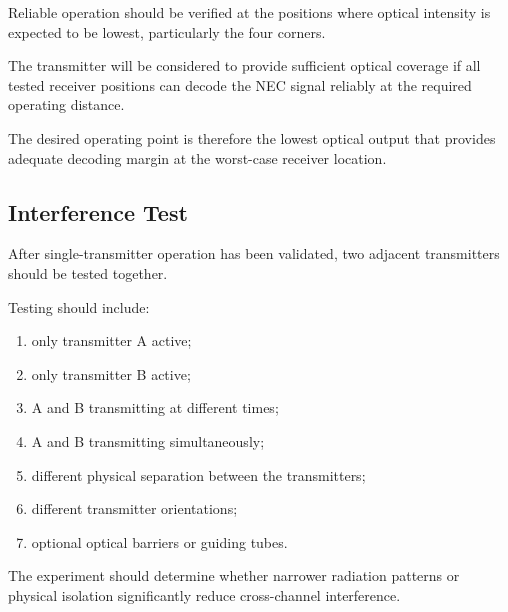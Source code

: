 \documentclass[a4paper,12pt]{article}
\begin{document}
Reliable operation should be verified at the positions where optical
intensity is expected to be lowest, particularly the four corners.

The transmitter will be considered to provide sufficient optical
coverage if all tested receiver positions can decode the NEC signal
reliably at the required operating distance.

The desired operating point is therefore the lowest optical output
that provides adequate decoding margin at the worst-case receiver
location.



\subsection{Interference Test}

After single-transmitter operation has been validated, two adjacent
transmitters should be tested together.

Testing should include:

\begin{enumerate}

    \item only transmitter A active;

    \item only transmitter B active;

    \item A and B transmitting at different times;

    \item A and B transmitting simultaneously;

    \item different physical separation between the transmitters;

    \item different transmitter orientations;

    \item optional optical barriers or guiding tubes.

\end{enumerate}

The experiment should determine whether narrower radiation patterns
or physical isolation significantly reduce cross-channel interference.


\end{document}
